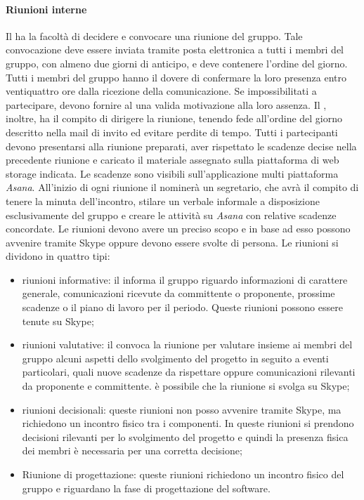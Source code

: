 			\paragraph{Riunioni interne}
			Il \textit{\RdP} ha la facoltà di decidere e convocare una riunione del gruppo. Tale convocazione deve essere inviata tramite posta elettronica a tutti i membri del gruppo, con almeno due giorni di anticipo, e deve contenere l’ordine del giorno. Tutti i membri del gruppo hanno il dovere di confermare la loro presenza entro ventiquattro ore dalla ricezione della comunicazione. Se impossibilitati a partecipare, devono fornire al \textit{\RdP} una valida motivazione alla loro assenza. Il \textit{\RdP}, inoltre, ha il compito di dirigere la riunione, tenendo fede all’ordine del giorno descritto nella mail di invito ed evitare perdite di tempo. Tutti i partecipanti devono presentarsi alla riunione preparati, aver rispettato le scadenze decise nella precedente riunione e caricato il materiale assegnato sulla piattaforma di web storage indicata. Le scadenze sono visibili sull'applicazione multi piattaforma \textit{Asana}.
			All’inizio di ogni riunione il \textit{\RdP} nominerà un segretario, che avrà il compito di tenere la minuta dell’incontro, stilare un verbale informale a disposizione esclusivamente del gruppo e creare le attività su \textit{Asana} con relative scadenze concordate.  
			Le riunioni devono avere un preciso scopo e in base ad esso possono avvenire tramite Skype oppure devono essere svolte di persona. Le riunioni si dividono in quattro tipi:
			\begin{itemize}
				\item riunioni informative: il \RdP informa il gruppo riguardo informazioni di carattere generale, comunicazioni ricevute da committente o proponente, prossime scadenze o il piano di lavoro per il periodo. Queste riunioni possono essere tenute su Skype;
				\item riunioni valutative: il \RdP convoca la riunione per valutare insieme ai membri del gruppo alcuni aspetti dello svolgimento del progetto in seguito a eventi particolari, quali nuove scadenze da rispettare oppure comunicazioni rilevanti da proponente e committente. è possibile che la riunione si svolga su Skype;
				\item riunioni decisionali: queste riunioni non posso avvenire tramite Skype, ma richiedono un incontro fisico tra i componenti. In queste riunioni si prendono decisioni rilevanti per lo svolgimento del progetto e quindi la presenza fisica dei membri è necessaria per una corretta decisione;
				\item Riunione di progettazione: queste riunioni richiedono un incontro fisico del gruppo e riguardano la fase di progettazione del software. 
			\end{itemize}
		
